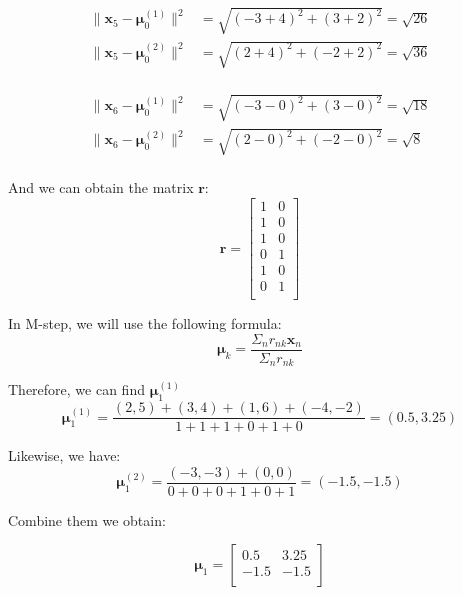 \begin{solution}
    \[
        \begin{align*}
            \lVert \bm{x}_5 - \bm{\mu}^{(1)}_0 \rVert^2 &= \sqrt{(-3 + 4)^2 + (3 + 2)^2} = \sqrt{26} \\
            \lVert \bm{x}_5 - \bm{\mu}^{(2)}_0 \rVert^2 &= \sqrt{(2 + 4)^2 + (-2 + 2)^2} = \sqrt{36} \\
        \end{align*}
    \]

    \[
        \begin{align*}
            \lVert \bm{x}_6 - \bm{\mu}^{(1)}_0 \rVert^2 &= \sqrt{(-3 - 0)^2 + (3 - 0)^2} = \sqrt{18} \\
            \lVert \bm{x}_6 - \bm{\mu}^{(2)}_0 \rVert^2 &= \sqrt{(2 - 0)^2 + (-2 - 0)^2} = \sqrt{8} \\
        \end{align*}
    \]

    And we can obtain the matrix $\bm{r}$:
    \[
        \bm{r} =
        \begin{bmatrix}
            1 & 0 \\
            1 & 0 \\
            1 & 0 \\
            0 & 1 \\
            1 & 0 \\
            0 & 1 \\
        \end{bmatrix}
    \]

     In M-step, we will use the following formula:
    \[
        \bm{\mu}_k = \frac{\Sigma_n r_{nk} \bm{x}_n}{\Sigma_n r_{nk}}
    \]

    Therefore, we can find $\bm{\mu}^{(1)}_1$
    \[
        \bm{\mu}^{(1)}_1
        = \frac{(2, 5) + (3, 4) + (1, 6) + (-4, -2)}{1 + 1 + 1 + 0 + 1 + 0}
        = \left( 0.5, 3.25 \right)
    \]

    Likewise, we have:
    \[
        \bm{\mu}^{(2)}_1
        = \frac{(-3, -3) + (0, 0)}{0 + 0 + 0 + 1 + 0 + 1}
        = (-1.5, -1.5)
    \]

    Combine them we obtain:

    \[
        \bm{\mu}_1 =
        \begin{bmatrix}
            0.5  & 3.25 \\
            -1.5 & -1.5 \\
        \end{bmatrix}
    \]
\end{solution}